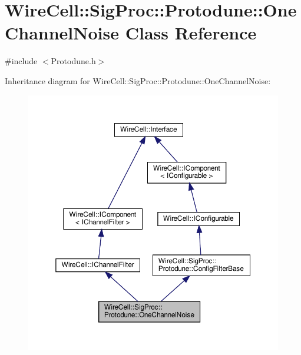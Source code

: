 \hypertarget{class_wire_cell_1_1_sig_proc_1_1_protodune_1_1_one_channel_noise}{}\section{Wire\+Cell\+:\+:Sig\+Proc\+:\+:Protodune\+:\+:One\+Channel\+Noise Class Reference}
\label{class_wire_cell_1_1_sig_proc_1_1_protodune_1_1_one_channel_noise}


{\ttfamily \#include $<$Protodune.\+h$>$}



Inheritance diagram for Wire\+Cell\+:\+:Sig\+Proc\+:\+:Protodune\+:\+:One\+Channel\+Noise\+:
\nopagebreak
\begin{figure}[H]
\begin{center}
\leavevmode
\includegraphics[width=350pt]{class_wire_cell_1_1_sig_proc_1_1_protodune_1_1_one_channel_noise__inherit__graph}
\end{center}
\end{figure}



